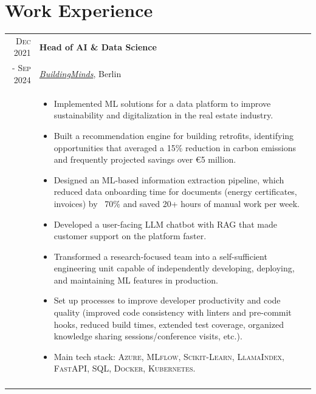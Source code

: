 \documentclass[a4paper,10pt]{article}
\begin{document}
\section{Work Experience}

\begin{tabular}{r|p{14.5cm}}

 \textsc{Dec 2021} & 
 \textbf{Head of AI \& Data Science} \\ 
 \textsc{- Sep 2024} & 
 \emph{\href{https://buildingminds.com/}{BuildingMinds}}, Berlin \\[-1.5mm]
 & \small\begin{itemize}[leftmargin=1em, itemsep=0.5mm, parsep=0mm]
   \item Implemented ML solutions for a data platform to improve sustainability and digitalization in the real estate industry.
   \item Built a recommendation engine for building retrofits, identifying opportunities that averaged a 15\% reduction in carbon emissions and frequently projected savings over €5 million.
   \item Designed an ML-based information extraction pipeline, which reduced data onboarding time for documents (energy certificates, invoices) by ~70\% and saved 20+ hours of manual work per week.
   \item Developed a user-facing LLM chatbot with RAG that made customer support on the platform faster.
   \item Transformed a research-focused team into a self-sufficient engineering unit capable of independently developing, deploying, and maintaining ML features in production.
   \item Set up processes to improve developer productivity and code quality
    {\scriptsize (improved code consistency with linters and pre-commit hooks, reduced build times, extended test coverage, organized knowledge sharing sessions/conference visits, etc.)}.
   \item Main tech stack: \textsc{Azure}, \textsc{MLflow}, \textsc{Scikit-Learn}, \textsc{LlamaIndex}, \textsc{FastAPI}, \textsc{SQL}, \textsc{Docker}, \textsc{Kubernetes}.
   \end{itemize} \\
   \multicolumn{2}{c}{} \\


\end{tabular}
\end{document}
